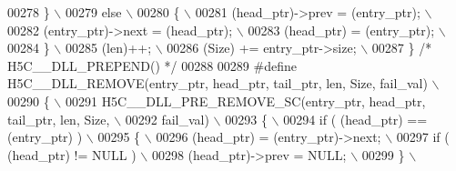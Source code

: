 \begin{DoxyCode}
00278 \textcolor{preprocessor}{    \}                                                                        \(\backslash\)}
00279 \textcolor{preprocessor}{    else                                                                     \(\backslash\)}
00280 \textcolor{preprocessor}{    \{                                                                        \(\backslash\)}
00281 \textcolor{preprocessor}{       (head\_ptr)->prev = (entry\_ptr);                                       \(\backslash\)}
00282 \textcolor{preprocessor}{       (entry\_ptr)->next = (head\_ptr);                                       \(\backslash\)}
00283 \textcolor{preprocessor}{       (head\_ptr) = (entry\_ptr);                                             \(\backslash\)}
00284 \textcolor{preprocessor}{    \}                                                                        \(\backslash\)}
00285 \textcolor{preprocessor}{    (len)++;                                                                 \(\backslash\)}
00286 \textcolor{preprocessor}{    (Size) += entry\_ptr->size;                                               \(\backslash\)}
00287 \textcolor{preprocessor}{\} }\textcolor{comment}{/* H5C\_\_DLL\_PREPEND() */}\textcolor{preprocessor}{}
00288 
00289 \textcolor{preprocessor}{#define H5C\_\_DLL\_REMOVE(entry\_ptr, head\_ptr, tail\_ptr, len, Size, fail\_val) \(\backslash\)}
00290 \textcolor{preprocessor}{\{                                                                           \(\backslash\)}
00291 \textcolor{preprocessor}{    H5C\_\_DLL\_PRE\_REMOVE\_SC(entry\_ptr, head\_ptr, tail\_ptr, len, Size,        \(\backslash\)}
00292 \textcolor{preprocessor}{                           fail\_val)                                        \(\backslash\)}
00293 \textcolor{preprocessor}{    \{                                                                       \(\backslash\)}
00294 \textcolor{preprocessor}{       if ( (head\_ptr) == (entry\_ptr) )                                     \(\backslash\)}
00295 \textcolor{preprocessor}{       \{                                                                    \(\backslash\)}
00296 \textcolor{preprocessor}{          (head\_ptr) = (entry\_ptr)->next;                                   \(\backslash\)}
00297 \textcolor{preprocessor}{          if ( (head\_ptr) != NULL )                                         \(\backslash\)}
00298 \textcolor{preprocessor}{             (head\_ptr)->prev = NULL;                                       \(\backslash\)}
00299 \textcolor{preprocessor}{       \}                                                                    \(\backslash\)}

\end{DoxyCode}

